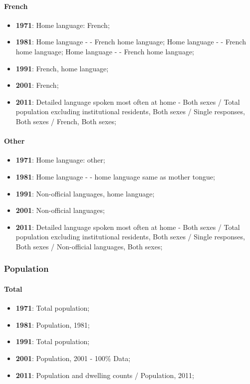 \documentclass[a4paper]{article}
\begin{document}
\paragraph{French}
\begin{itemize}
   \item{\textbf{1971}:  Home language: French;}
   \item{\textbf{1981}:  Home language - - French home language; Home language - - French home language; Home language - - French home language;}
   \item{\textbf{1991}:  French, home language;}
   \item{\textbf{2001}:  French;}
   \item{\textbf{2011}:  Detailed language spoken most often at home - Both sexes / Total population excluding institutional residents, Both sexes / Single responses, Both sexes / French, Both sexes;}
\end{itemize}

\paragraph{Other}
\begin{itemize}
   \item{\textbf{1971}:  Home language: other;}
   \item{\textbf{1981}:  Home language - - home language same as mother tongue;}
   \item{\textbf{1991}:  Non-official languages, home language;}
   \item{\textbf{2001}:  Non-official languages;}
   \item{\textbf{2011}:  Detailed language spoken most often at home - Both sexes / Total population excluding institutional residents, Both sexes / Single responses, Both sexes / Non-official languages, Both sexes;}
\end{itemize}

\subsubsection{Population}
\paragraph{Total}
\begin{itemize}
   \item{\textbf{1971}:  Total population;}
   \item{\textbf{1981}:  Population, 1981;}
   \item{\textbf{1991}:  Total population;}
   \item{\textbf{2001}:  Population, 2001 - 100\% Data;}
   \item{\textbf{2011}:  Population and dwelling counts / Population, 2011;}
\end{itemize}
\end{document}
